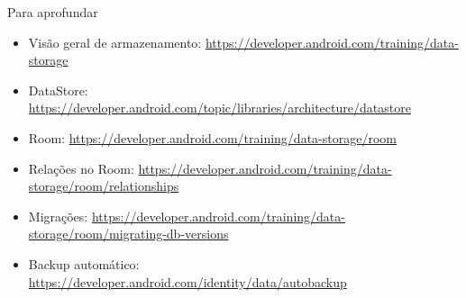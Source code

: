 \documentclass[aspectratio=169,10pt]{beamer}
\begin{document}
\begin{frame}{Para aprofundar}
  \small
  \begin{itemize}
    \item Visão geral de armazenamento: \url{https://developer.android.com/training/data-storage}
    \item DataStore: \url{https://developer.android.com/topic/libraries/architecture/datastore}
    \item Room: \url{https://developer.android.com/training/data-storage/room}
    \item Relações no Room: \url{https://developer.android.com/training/data-storage/room/relationships}
    \item Migrações: \url{https://developer.android.com/training/data-storage/room/migrating-db-versions}
    \item Backup automático: \url{https://developer.android.com/identity/data/autobackup}
  \end{itemize}
\end{frame}

\end{document}
